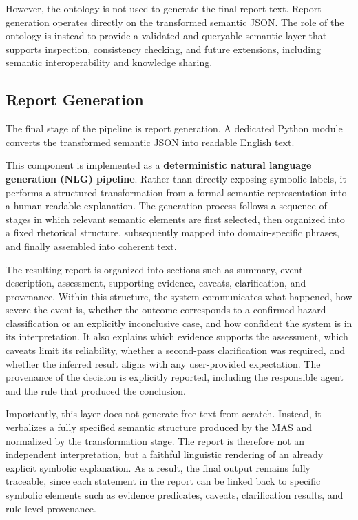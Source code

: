 \documentclass[12pt]{article}
\begin{document}
However, the ontology is not used to generate the final report text. Report generation operates directly on the transformed semantic JSON. The role of the ontology is instead to provide a validated and queryable semantic layer that supports inspection, consistency checking, and future extensions, including semantic interoperability and knowledge sharing.
\subsection{Report Generation}

The final stage of the pipeline is report generation. A dedicated Python module converts the transformed semantic JSON into readable English text.

This component is implemented as a \textbf{deterministic natural language generation (NLG) pipeline}. Rather than directly exposing symbolic labels, it performs a structured transformation from a formal semantic representation into a human-readable explanation. The generation process follows a sequence of stages in which relevant semantic elements are first selected, then organized into a fixed rhetorical structure, subsequently mapped into domain-specific phrases, and finally assembled into coherent text.

The resulting report is organized into sections such as summary, event description, assessment, supporting evidence, caveats, clarification, and provenance. Within this structure, the system communicates what happened, how severe the event is, whether the outcome corresponds to a confirmed hazard classification or an explicitly inconclusive case, and how confident the system is in its interpretation. It also explains which evidence supports the assessment, which caveats limit its reliability, whether a second-pass clarification was required, and whether the inferred result aligns with any user-provided expectation. The provenance of the decision is explicitly reported, including the responsible agent and the rule that produced the conclusion.

Importantly, this layer does not generate free text from scratch. Instead, it verbalizes a fully specified semantic structure produced by the MAS and normalized by the transformation stage. The report is therefore not an independent interpretation, but a faithful linguistic rendering of an already explicit symbolic explanation. As a result, the final output remains fully traceable, since each statement in the report can be linked back to specific symbolic elements such as evidence predicates, caveats, clarification results, and rule-level provenance.
\end{document}
